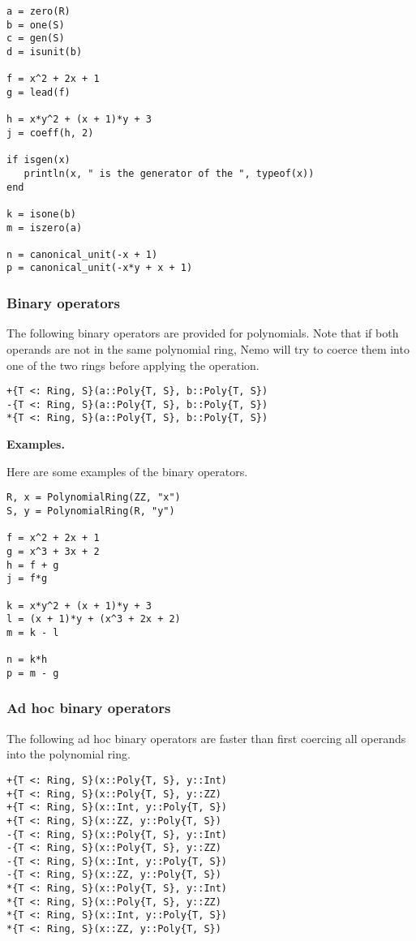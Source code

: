 \documentclass[a4paper,10pt]{article}
\begin{document}
{{\begin{lstlisting}
a = zero(R)
b = one(S)
c = gen(S)
d = isunit(b)

f = x^2 + 2x + 1
g = lead(f)

h = x*y^2 + (x + 1)*y + 3
j = coeff(h, 2)

if isgen(x)
   println(x, " is the generator of the ", typeof(x))
end

k = isone(b)
m = iszero(a)

n = canonical_unit(-x + 1)
p = canonical_unit(-x*y + x + 1)
\end{lstlisting}

\subsubsection{Binary operators}

The following binary operators are provided for polynomials. Note that
if both operands are not in the same polynomial ring, Nemo will try to
coerce them into one of the two rings before applying the operation.

\begin{lstlisting}
+{T <: Ring, S}(a::Poly{T, S}, b::Poly{T, S})
-{T <: Ring, S}(a::Poly{T, S}, b::Poly{T, S})
*{T <: Ring, S}(a::Poly{T, S}, b::Poly{T, S})
\end{lstlisting}

\textbf{Examples.}

Here are some examples of the binary operators.

\begin{lstlisting}
R, x = PolynomialRing(ZZ, "x")
S, y = PolynomialRing(R, "y")

f = x^2 + 2x + 1
g = x^3 + 3x + 2
h = f + g
j = f*g

k = x*y^2 + (x + 1)*y + 3
l = (x + 1)*y + (x^3 + 2x + 2)
m = k - l

n = k*h
p = m - g
\end{lstlisting}

\subsubsection{Ad hoc binary operators}

The following ad hoc binary operators are faster than first coercing all
operands into the polynomial ring.

\begin{lstlisting}
+{T <: Ring, S}(x::Poly{T, S}, y::Int)
+{T <: Ring, S}(x::Poly{T, S}, y::ZZ)
+{T <: Ring, S}(x::Int, y::Poly{T, S})
+{T <: Ring, S}(x::ZZ, y::Poly{T, S})
-{T <: Ring, S}(x::Poly{T, S}, y::Int)
-{T <: Ring, S}(x::Poly{T, S}, y::ZZ)
-{T <: Ring, S}(x::Int, y::Poly{T, S})
-{T <: Ring, S}(x::ZZ, y::Poly{T, S})
*{T <: Ring, S}(x::Poly{T, S}, y::Int)
*{T <: Ring, S}(x::Poly{T, S}, y::ZZ)
*{T <: Ring, S}(x::Int, y::Poly{T, S})
*{T <: Ring, S}(x::ZZ, y::Poly{T, S})
\end{lstlisting}

}}
\end{document}
